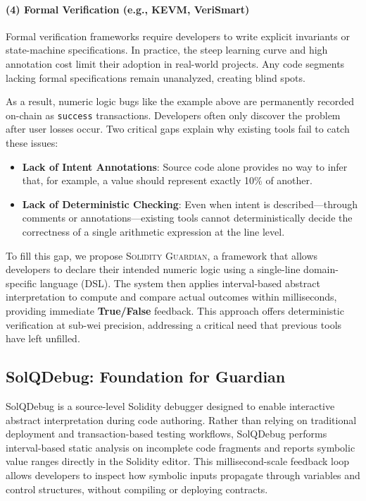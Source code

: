 \documentclass[pdflatex,sn-basic]{sn-jnl}%
\theoremstyle{thmstyleone}%
\theoremstyle{thmstyletwo}%
\theoremstyle{thmstylethree}%
\begin{document}
\paragraph{(4) Formal Verification (e.g., KEVM, VeriSmart)}
Formal verification frameworks require developers to write explicit invariants or state-machine specifications. In practice, the steep learning curve and high annotation cost limit their adoption in real-world projects. Any code segments lacking formal specifications remain unanalyzed, creating blind spots.

\smallskip

As a result, numeric logic bugs like the example above are permanently recorded on-chain as \texttt{success} transactions. Developers often only discover the problem after user losses occur. Two critical gaps explain why existing tools fail to catch these issues:
\begin{itemize}
    \item \textbf{Lack of Intent Annotations}: Source code alone provides no way to infer that, for example, a value should represent exactly 10\% of another.
    \item \textbf{Lack of Deterministic Checking}: Even when intent is described—through comments or annotations—existing tools cannot deterministically decide the correctness of a single arithmetic expression at the line level.
\end{itemize}

To fill this gap, we propose \textsc{Solidity Guardian}, a framework that allows developers to declare their intended numeric logic using a single-line domain-specific language (DSL). The system then applies interval-based abstract interpretation to compute and compare actual outcomes within milliseconds, providing immediate \textbf{True/False} feedback. This approach offers deterministic verification at sub-wei precision, addressing a critical need that previous tools have left unfilled.


\subsection{SolQDebug: Foundation for Guardian}

SolQDebug is a source-level Solidity debugger designed to enable interactive abstract interpretation during code authoring. Rather than relying on traditional deployment and transaction-based testing workflows, SolQDebug performs interval-based static analysis on incomplete code fragments and reports symbolic value ranges directly in the Solidity editor. This millisecond-scale feedback loop allows developers to inspect how symbolic inputs propagate through variables and control structures, without compiling or deploying contracts.
\end{document}
